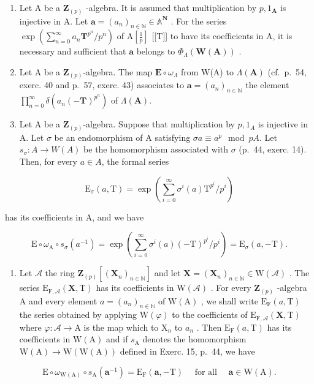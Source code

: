 \begin{enumerate}
\def\labelenumi{\alph{enumi})}
\setcounter{enumi}{2}
\item
  Let A be a \(\mathbf{Z}_{(p)}\) -algebra. It is assumed that multiplication by \(p, 1_{\mathbf{A}}\) is injective in A. Let \(\boldsymbol{a} = (a_n)_{n \in \mathbb{N}} \in \mathbb{A}^{\mathbf{N}}\) . For the series \(\exp\left(\sum_{n=0}^{\infty} a_n \mathbf{T}^{p^n} / p^n\right)\) of \(\mathrm{A}\left[\frac{1}{p}\right]\) {[}{[}T{]}{]} to have its coefficients in A, it is necessary and sufficient that \(\boldsymbol{a}\) belongs to \(\Phi_{\Lambda}(\mathbf{W}(\mathbf{A}))\) .
\item
  Let A be a \(\mathbf{Z}_{(p)}\)-algebra. The map \(\mathbf{E} \circ \omega_{\Lambda}\) from W(A) to \(\Lambda(\mathbf{A})\) (cf.~p.~54, exerc. 40 and p.~57, exerc. 43) associates to \(\boldsymbol{a} = (a_n)_{n \in \mathbb{N}}\) the element \(\prod_{n=0}^{\infty} \delta(a_n(-\mathbf{T})^{p^n})\) of \(\Lambda(\mathbf{A})\).
\item
  Let A be a \(\mathbf{Z}_{(p)}\)-algebra. Suppose that multiplication by \(p,1_{A}\) is injective in A. Let \(\sigma\) be an endomorphism of A satisfying \(\sigma a \equiv a^{p} \mod pA\). Let \(s_{\sigma}:A \to W(A)\) be the homomorphism associated with \(\sigma\) (p.~44, exerc. 14). Then, for every \(a \in A\), the formal series
\end{enumerate}

\[
\mathrm{E} _ {\sigma} (a, \mathrm{T}) = \exp (\sum_ {i = 0} ^ {\infty} \sigma^ {i} (a) \mathrm{T} ^ {p ^ {i}} / p ^ {i})
\]

has its coefficients in A, and we have

\[
\mathrm{E} \circ \omega_ {\mathrm{A}} \circ s _ {\sigma} (a ^ {- 1}) = \exp \left(\sum_ {i = 0} ^ {\infty} \sigma^ {i} (a) (- \mathrm{T}) ^ {p ^ {i}} / p ^ {i}\right) = \mathrm{E} _ {\sigma} (a, - \mathrm{T}).
\]

\begin{enumerate}
\def\labelenumi{\alph{enumi})}
\setcounter{enumi}{5}
\tightlist
\item
  Let \(\mathcal{A}\) the ring \(\mathbf{Z}_{(p)}[(\mathbf{X}_n)_{n\in\mathbb{N}}]\) and let \(\mathbf{X} = (\mathbf{X}_n)_{n\in\mathbb{N}} \in \mathrm{W}(\mathcal{A})\) . The series \(\mathrm{E}_{\mathrm{F},\mathcal{A}}(\mathbf{X},\mathrm{T})\) has its coefficients in \(\mathrm{W}(\mathcal{A})\) . For every \(\mathbf{Z}_{(p)}\) -algebra A and every element \(a = (a_n)_{n\in\mathbb{N}}\) of \(\mathrm{W}(\mathrm{A})\) , we shall write \(\mathrm{E}_{\mathrm{F}}(a,\mathrm{T})\) the series obtained by applying \(\mathrm{W}(\varphi)\) to the coefficients of \(\mathrm{E}_{\mathrm{F},\mathcal{A}}(\mathbf{X},\mathrm{T})\) where \(\varphi: \mathcal{A} \to \mathrm{A}\) is the map which to \(\mathrm{X}_n\) to \(a_n\) . Then \(\mathrm{E}_{\mathrm{F}}(a,\mathrm{T})\) has its coefficients in \(\mathrm{W}(\mathrm{A})\) and if \(s_{\mathrm{A}}\) denotes the homomorphism \(\mathrm{W}(\mathrm{A}) \to \mathrm{W}(\mathrm{W}(\mathrm{A}))\) defined in Exerc. 15, p.~44, we have
\end{enumerate}

\[
\mathrm{E} \circ \omega_ {\mathrm{W(A)}} \circ s _ {\mathrm{A}} (\boldsymbol {a} ^ {- 1}) = \mathrm{E} _ {\mathrm{F}} (\boldsymbol {a}, - \mathrm{T}) \quad \text { for all } \quad \boldsymbol {a} \in \mathrm{W(A)}.
\]

